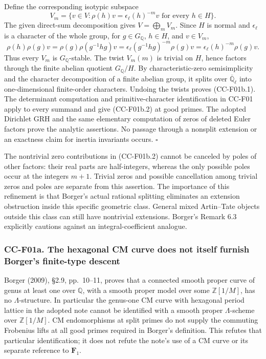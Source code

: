 \documentclass[11pt,a4paper]{article}
\theoremstyle{definition}\newtheorem{definition}[theorem]{Definition}
\theoremstyle{remark}\newtheorem{remark}[theorem]{Remark}
\begin{document}
Define the corresponding isotypic subspace \[
 V_m=\{v\in V:\rho(h)v=\epsilon_\ell(h)^{-m}v\text{ for every }h\in H\}.
\] The given direct-sum decomposition gives \(V=\bigoplus_m V_m\). Since
\(H\) is normal and \(\epsilon_\ell\) is a character of the whole group,
for \(g\in G_\mathbb Q\), \(h\in H\), and \(v\in V_m\), \[
 \rho(h)\rho(g)v
 =\rho(g)\rho(g^{-1}hg)v
 =\epsilon_\ell(g^{-1}hg)^{-m}\rho(g)v
 =\epsilon_\ell(h)^{-m}\rho(g)v.
\] Thus every \(V_m\) is \(G_\mathbb Q\)-stable. The twist \(V_m(m)\) is
trivial on \(H\), hence factors through the finite abelian quotient
\(G_\mathbb Q/H\). By characteristic-zero semisimplicity and the
character decomposition of a finite abelian group, it splits over
\(\overline{\mathbb Q}_\ell\) into one-dimensional finite-order
characters. Undoing the twists proves (CC-F01b.1). The determinant
computation and primitive-character identification in CC-F01 apply to
every summand and give (CC-F01b.2) at good primes. The adopted Dirichlet
GRH and the same elementary computation of zeros of deleted Euler
factors prove the analytic assertions. No passage through a nonsplit
extension or an exactness claim for inertia invariants occurs.
\(\square\)

The nontrivial zero contributions in (CC-F01b.2) cannot be canceled by
poles of other factors: their real parts are half-integers, whereas the
only possible poles occur at the integers \(m+1\). Trivial zeros and
possible cancellation among trivial zeros and poles are separate from
this assertion. The importance of this refinement is that Borger's
actual rational splitting eliminates an extension obstruction inside
this specific geometric class. General mixed Artin--Tate objects outside
this class can still have nontrivial extensions. Borger's Remark 6.3
explicitly cautions against an integral-coefficient analogue.

\subsubsection{CC-F01a. The hexagonal CM curve does not itself furnish
Borger's finite-type
descent}\label{cc-f01a.-the-hexagonal-cm-curve-does-not-itself-furnish-borgers-finite-type-descent}

Borger (2009), §2.9, pp.~10--11, proves that a connected smooth proper
curve of genus at least one over \(\mathbb Q\), with a smooth proper
model over some \(\mathbb Z[1/M]\), has no \(\Lambda\)-structure. In
particular the genus-one CM curve with hexagonal period lattice in the
adopted note cannot be identified with a smooth proper
\(\Lambda\)-scheme over \(\mathbb Z[1/M]\). CM endomorphisms at split
primes do not supply the commuting Frobenius lifts at all good primes
required in Borger's definition. This refutes that particular
identification; it does not refute the note's use of a CM curve or its
separate reference to \(\mathbf F_1\).
\end{document}

